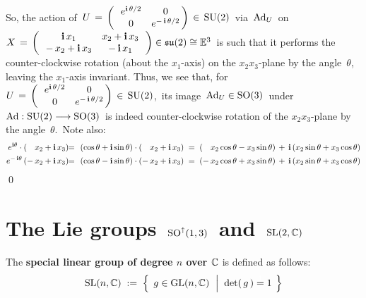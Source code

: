 So, the action of
\,$U \, = \, \left(\,\begin{array}{cc} e^{\textnormal{\bf i}\,{\color{black}\theta/2}} & 0 \\ 0 & e^{-\,\textnormal{\bf i}\,\theta/2} \end{array}\!\!\right) \,\in\, \textnormal{SU}(2)$\,
via \,$\textnormal{Ad}_{U}$\, on
\,$X
\, = \,
\left(\,\begin{array}{cc}
	\textnormal{\bf i}\,x_{1} & x_{2} + \textnormal{\bf i}\,x_{3}
	\\
	- \, x_{2} + \textnormal{\bf i}\,x_{3} & -\,\textnormal{\bf i}\,x_{1}
	\end{array}\,\right)
\in \mathfrak{su}(2) \cong \mathbb{E}^{3}$\,
is such that it performs the counter-clockwise rotation (about the $x_{1}$-axis)
on the $x_{2}x_{3}$-plane by the angle \,{\color{black}$\theta$},\, leaving the $x_{1}$-axis invariant.
Thus, we see that, for
\,$U \, = \, \left(\,\begin{array}{cc} e^{\textnormal{\bf i}\,{\color{black}\theta/2}} & 0 \\ 0 & e^{-\,\textnormal{\bf i}\,\theta/2} \end{array}\!\!\right) \,\in\, \textnormal{SU}(2)$,\,
its image
\,$\textnormal{Ad}_{U} \in \textnormal{SO}(3)$\,
under
\,$\textnormal{Ad} : \textnormal{SU}(2) \longrightarrow \textnormal{SO}(3)$\,
is indeed counter-clockwise rotation of the $x_{2}x_{3}$-plane by the angle \,{\color{black}$\theta$}.\,
Note also:
\begin{eqnarray*}
e^{\i\theta} \cdot ({\color{white}-}\,x_{2}+\i\,x_{3})
& \!\!=\!\! &
	(\cos\theta + \i\sin\theta) \cdot ({\color{white}-}\,x_{2}+\i\,x_{3})
\; = \;
	({\color{white}-}\,x_{2}\cos\theta - x_{3}\sin\theta) \,+\, \i\,(x_{2}\sin\theta + x_{3}\cos\theta)
\\
e^{-\,\i\theta}\,(-\,x_{2}+\i\,x_{3})
& \!\!=\!\! &
	(\cos\theta - \i\sin\theta) \cdot ({\color{black}-}\,x_{2}+\i\,x_{3})
\; = \;
	(-\,x_{2}\cos\theta + x_{3}\sin\theta) \,+\, \i\,(x_{2}\sin\theta + x_{3}\cos\theta)
\end{eqnarray*}
\qed


\vskip 1.0cm
\section{The Lie groups \,$\textnormal{SO}^{\uparrow}(1,3)$\, and \,$\textnormal{SL}(2,\mathbb{C})$}


\vskip 0.3cm
\begin{definition}
\mbox{}
\vskip 0.1cm
\noindent
The \textbf{special linear group of degree $n$ over $\mathbb{C}$} is defined as follows:
\begin{equation*}
\SL(n,\C)
\; := \;
	\left\{\;\,
		g \overset{{\color{white}.}}{\in} \textnormal{GL}(n,\C)
		\;\,\left\vert\;\;
			\det(\,g\,) \overset{{\color{white}1}}{=} 1
			\right.
		\;\right\}
\end{equation*}
\end{definition}

